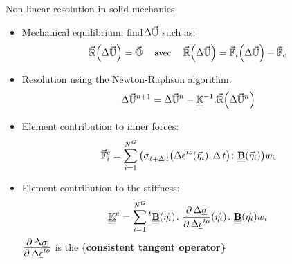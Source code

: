 \documentclass{beamer}
\providecommand{\tightlist}{%
  \setlength{\itemsep}{0pt}\setlength{\parskip}{0pt}}
\begin{document}
\begin{frame}{Non linear resolution in solid mechanics}
\protect\hypertarget{non-linear-resolution-in-solid-mechanics}{}
\begin{itemize}
\tightlist
\item
  Mechanical equilibrium:
  find\(\Delta\ensuremath{\mathbb{\uppercase{\vec{u}}}}\) such as: \[
    \small
    \ensuremath{\ensuremath{\mathbb{\uppercase{\vec{R}}}}}{\left(\Delta\ensuremath{\mathbb{\uppercase{\vec{u}}}}\right)}=\ensuremath{\mathbb{\uppercase{\vec{O}}}}\quad\text{
      avec
    }\quad\ensuremath{\ensuremath{\mathbb{\uppercase{\vec{R}}}}}{\left(\Delta\ensuremath{\mathbb{\uppercase{\vec{u}}}}\right)}=\ensuremath{\ensuremath{\mathbb{\uppercase{\vec{F}}}}_{i}}{\left(\Delta\ensuremath{\mathbb{\uppercase{\vec{u}}}}\right)}-\ensuremath{\ensuremath{\mathbb{\uppercase{\vec{F}}}}_{e}}
    \]

  \item

  Resolution using the Newton-Raphson algorithm: \[
    \small
      \Delta\ensuremath{\mathbb{\uppercase{\vec{u}}}}^{n+1}=\Delta\ensuremath{\mathbb{\uppercase{\vec{u}}}}^{n}-\ensuremath{\underline{\underline{\mathbf{\mathbb{K}}}}}^{-1}.\ensuremath{\ensuremath{\mathbb{\uppercase{\vec{R}}}}}{\left(\Delta\ensuremath{\mathbb{\uppercase{\vec{u}}}}^{n}\right)}
    \]
\item
  Element contribution to inner forces: \[
      \small
      \ensuremath{\ensuremath{\mathbb{\uppercase{\vec{F}}}}_{i}^{e}}= \sum_{i=1}^{N^{G}} {\left(\ensuremath{\ensuremath{\underline{\mathbf{\sigma}}}}_{t+\Delta\,t}{\left(\Delta\ensuremath{\ensuremath{\underline{\mathbf{\epsilon}}}^{\mathit{to}}}{\left(\vec{\eta}_{i}\right)},\Delta\, t\right)}\colon\ensuremath{\underline{\underline{\mathbf{B}}}}{\left(\vec{\eta}_{i}\right)}\right)}w_{i}
      \]
\item
  Element contribution to the stiffness: \[
      \small
      \ensuremath{\underline{\underline{\mathbf{\mathbb{K}}}}}^{e}=\displaystyle\sum_{i=1}^{N^{G}}
      \mbox{}^{t}\ensuremath{\underline{\underline{\mathbf{B}}}}{\left(\vec{\eta}_{i}\right)}\colon\frac{\displaystyle\partial\,\Delta\ensuremath{\ensuremath{\underline{\mathbf{\sigma}}}}}{\displaystyle\partial\,\Delta\ensuremath{\ensuremath{\underline{\mathbf{\epsilon}}}^{\mathit{to}}}}{\left(\vec{\eta}_{i}\right)}\colon\ensuremath{\underline{\underline{\mathbf{B}}}}{\left(\vec{\eta}_{i}\right)}w_{i}
      \]
  \(\scriptsize\frac{\displaystyle\partial\,\Delta\ensuremath{\ensuremath{\underline{\mathbf{\sigma}}}}}{\displaystyle\partial\,\Delta\ensuremath{\ensuremath{\underline{\mathbf{\epsilon}}}^{\mathit{to}}}}\)
  is the \{\bf consistent tangent operator\}
\end{itemize}
\end{frame}
\end{document}
